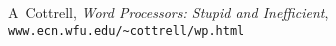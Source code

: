 \begin{references}
\begin{thebibliography}{9999}
    A~Cottrell, 
        \textsl{Word Processors: Stupid and Inefficient},
        \\ \mbox{}\hfill\texttt{www.ecn.wfu.edu/\~{}cottrell/wp.html}
\end{thebibliography}
\end{references}